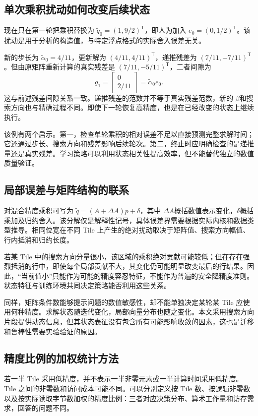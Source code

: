 \subsection{单次乘积扰动如何改变后续状态}
现在只在第一轮把乘积替换为 $\widetilde q_0=(1,9/2)^{\mathsf T}$，即人为加入 $e_0=(0,1/2)^{\mathsf T}$。该扰动是用于分析的构造值，与特定浮点格式的实际舍入误差无关。

新的步长为 $\widetilde\alpha_0=4/11$，更新解为 $(4/11,4/11)^{\mathsf T}$，递推残差为 $(7/11,-7/11)^{\mathsf T}$。但由原矩阵重新计算的真实残差是 $(7/11,-5/11)^{\mathsf T}$，二者间隙为
\begin{equation}
 g_1=\begin{bmatrix}0\\2/11\end{bmatrix}
 =\widetilde\alpha_0e_0.
\end{equation}
这与前述残差间隙关系一致。递推残差的范数并不等于真实残差范数，新的 $\beta$和搜索方向也与精确过程不同。即使下一轮恢复高精度，也是在已经改变的状态上继续执行。

该例有两个启示。第一，检查单轮乘积的相对误差不足以直接预测完整求解时间；它还通过步长、搜索方向和残差影响后续轮次。第二，终止时应明确检查的是递推量还是真实残差。学习策略可以利用状态相关性提高效率，但不能替代独立的数值质量验证。

\subsection{局部误差与矩阵结构的联系}
对混合精度乘积可写为 $\widetilde q=(A+\Delta A)p+\delta$，其中 $\Delta A$概括数值表示变化，$\delta$概括乘加及归约舍入。该分解仅是解释性记号，具体误差界需要根据实际内核和数据类型推导。相同位宽在不同 Tile 上产生的绝对扰动取决于矩阵值、搜索方向幅值、行内抵消和归约长度。

若某 Tile 中的搜索方向分量很小，该区域的乘积绝对贡献可能较低；但在存在强烈抵消的行中，即使每个局部贡献不大，其变化仍可能明显改变最后的行结果。因此，“当前值小”只能作为可能的精度容忍特征，不能作为普遍的安全降精度准则。状态特征与训练环境共同决定策略能否利用这些关系。

同样，矩阵条件数能够提示问题的数值敏感性，却不能单独决定某轮某 Tile 应使用何种精度。求解状态随迭代变化，局部向量分布也随之变化。本文采用搜索方向片段提供动态信息，但其状态表征没有包含所有可能影响收敛的因素，这也是迁移和鲁棒性需要实验验证的原因。

\subsection{精度比例的加权统计方法}
若一半 Tile 采用低精度，并不表示一半非零元素或一半计算时间采用低精度。Tile 之间的非零数和访问成本可能不同。可以分别定义按 Tile 数、按逻辑非零数以及按实际读取字节数加权的精度比例：三者对应决策分布、算术工作量和访存需求，回答的问题不同。

